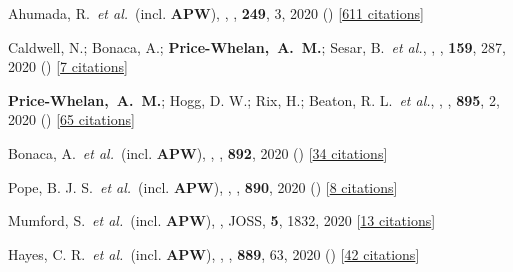\item[{\color{deemph}\scriptsize66}]Ahumada, R.~\textit{et al.}~(incl. \textbf{APW}), , \apjs, \textbf{249}, 3, 2020 () [\href{http://adsabs.harvard.edu/abs/2020ApJS..249....3A}{611 citations}]

\item[{\color{deemph}\scriptsize65}]Caldwell, N.; Bonaca, A.; \textbf{Price-Whelan,~A.~M.}; Sesar, B.~\textit{et al.}, , \aj, \textbf{159}, 287, 2020 () [\href{http://adsabs.harvard.edu/abs/2020AJ....159..287C}{7 citations}]

\item[{\color{deemph}\scriptsize64}]\textbf{Price-Whelan,~A.~M.}; Hogg, D. W.; Rix, H.; Beaton, R. L.~\textit{et al.}, , \apj, \textbf{895}, 2, 2020 () [\href{http://adsabs.harvard.edu/abs/2020ApJ...895....2P}{65 citations}]

\item[{\color{deemph}\scriptsize63}]Bonaca, A.~\textit{et al.}~(incl. \textbf{APW}), , \apj, \textbf{892}, 2020 () [\href{http://adsabs.harvard.edu/abs/2020ApJ...892L..37B}{34 citations}]

\item[{\color{deemph}\scriptsize62}]Pope, B. J. S.~\textit{et al.}~(incl. \textbf{APW}), , \apj, \textbf{890}, 2020 () [\href{http://adsabs.harvard.edu/abs/2020ApJ...890L..19P}{8 citations}]

\item[{\color{deemph}\scriptsize61}]Mumford, S.~\textit{et al.}~(incl. \textbf{APW}), , JOSS, \textbf{5}, 1832, 2020 [\href{http://adsabs.harvard.edu/abs/2020JOSS....5.1832M}{13 citations}]

\item[{\color{deemph}\scriptsize60}]Hayes, C. R.~\textit{et al.}~(incl. \textbf{APW}), , \apj, \textbf{889}, 63, 2020 () [\href{http://adsabs.harvard.edu/abs/2020ApJ...889...63H}{42 citations}]


